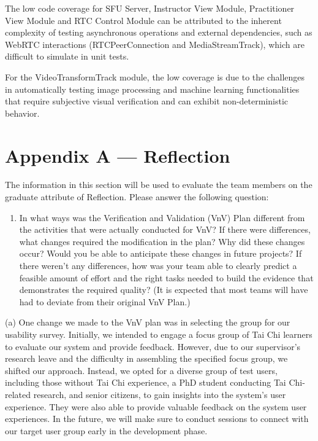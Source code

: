 \documentclass[12pt, titlepage]{article}
\begin{document}
The low code coverage for SFU Server, Instructor View Module, Practitioner View
Module and RTC Control Module can be attributed to the inherent complexity of
testing asynchronous operations and external dependencies, such as WebRTC
interactions (RTCPeerConnection and MediaStreamTrack), which are difficult to
simulate in unit tests.

For the VideoTransformTrack module, the low coverage is due to the challenges in
automatically testing image processing and machine learning functionalities that
require subjective visual verification and can exhibit non-deterministic
behavior.

\newpage{}
\section*{Appendix A --- Reflection}

The information in this section will be used to evaluate the team members on the
graduate attribute of Reflection.  Please answer the following question:

\begin{enumerate}
  \item In what ways was the Verification and Validation (VnV) Plan different
  from the activities that were actually conducted for VnV?  If there were
  differences, what changes required the modification in the plan?  Why did
  these changes occur?  Would you be able to anticipate these changes in future
  projects?  If there weren't any differences, how was your team able to clearly
  predict a feasible amount of effort and the right tasks needed to build the
  evidence that demonstrates the required quality?  (It is expected that most
  teams will have had to deviate from their original VnV Plan.)
\end{enumerate}

(a) One change we made to the VnV plan was in selecting the group for our
usability survey. Initially, we intended to engage a focus group of Tai Chi
learners to evaluate our system and provide feedback. However, due to our
supervisor's research leave and the difficulty in assembling the specified focus
group, we shifted our approach. Instead, we opted for a diverse group of test
users, including those without Tai Chi experience, a PhD student conducting Tai
Chi-related research, and senior citizens, to gain insights into the system's
user experience. They were also able to provide valuable feedback on the system
user experiences. In the future, we will make sure to conduct sessions to connect with our target 
user group early in the development phase.
\end{document}
